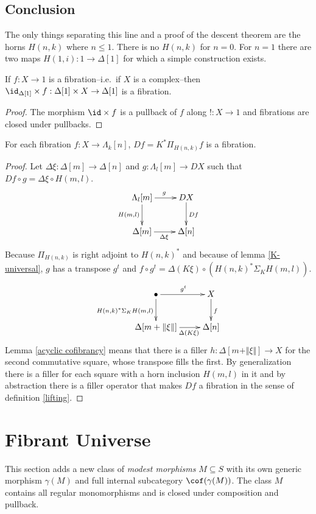 \documentclass{tac}
\newcommand\ri{^*}
\newcommand\bang{!}
\newcommand\of{:}
\newcommand\simplex\Delta
\newcommand\horn\Lambda
\newcommand\gen\gamma
\newcommand\norm[1]{\Vert #1 \Vert}
\newcommand\depprod{\Pi_}
\newcommand\depsum{\Sigma_}
\begin{document}
\subsection{Conclusion}
The only things separating this line and a proof of the descent theorem are the horns $H(n,k)$ where $n\leq 1$. There is no $H(n,k)$ for $n=0$. For $n=1$ there are two maps $H(1,i)\of 1\to \simplex[1]$ for which a simple construction exists.

\begin{lemma} If $f\of X\to 1$ is a fibration--i.e.\ if $X$ is a complex--then $\id_{\simplex[1]}\times f\of\simplex[1]\times X\to \simplex[1]$ is a fibration. \end{lemma}

\begin{proof} The morphism $\id\times f$ is a pullback of $f$ along $\bang\of X\to 1$ and fibrations are closed under pullbacks. \end{proof}

\begin{theorem} For each fibration $f\of X\to\horn_k[n]$, $Df=K\ri\depprod{H(n,k)}f$ is a fibration. \label{descent} \end{theorem}


\begin{proof} Let $\simplex\xi\of \simplex[m]\to\simplex[n]$ and $g\of \horn_l[m]\to DX$ such that $Df\circ g = \simplex\xi\circ H(m,l)$. 
\[
	\xymatrix{
		\horn_l[m]\ar[r]^g\ar[d]_{H(m,l)} & DX\ar[d]^{Df} \\
		\simplex[m]\ar[r]_{\simplex\xi} & \simplex[n]
	}	
\]
Because $\depprod{H(n,k)}$ is right adjoint to $H(n,k)\ri$ and because of lemma \ref{K-universal}, $g$ has a transpose $g^t$ and $f\circ g^t = \simplex(K\xi)\circ (H(n,k)\ri \depsum{K} H(m,l))$.
\[
	\xymatrix{
		\bullet\ar[r]^{g^t}\ar[d]_{H(n,k)\ri \depsum K H(m,l)} & X\ar[d]^{f} \\
		\simplex[m+\norm\xi]\ar[r]_(.6){\simplex(K\xi)} & \simplex[n]
	}	
\]
Lemma \ref{acyclic cofibrancy} means that there is a filler $h\of \simplex[m+\norm\xi]\to X$ for the second commutative square, whose transpose fills the first.
By generalization there is a filler for each square with a horn inclusion $H(m,l)$ in it and by abstraction there is a filler operator that makes $Df$ a fibration in the sense of definition \ref{lifting}.
\end{proof}

\section{Fibrant Universe}
This section adds a new class of \emph{modest morphisms} $M\subseteq S$ with its own generic morphism $\gen(M)$ and full internal subcategory $\cof(\gen(M))$. The class $M$ contains all regular monomorphisms and is closed under composition and pullback. 
\end{document}
